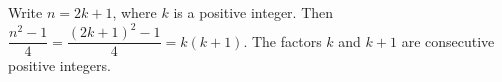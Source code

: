 Write $n=2k+1$, where $k$ is a positive integer. Then $\dfrac{n^2-1}{4}=\dfrac{(2k+1)^2-1}{4}=k(k+1)$. The factors $k$ and $k+1$ are consecutive positive integers.
